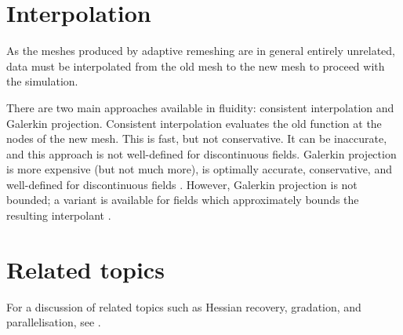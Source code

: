 \section{Interpolation} \label{sec:interpolation}
As the meshes produced by adaptive remeshing are in general entirely
unrelated, data must be interpolated from the old mesh to the new mesh
to proceed with the simulation.

There are two main approaches available in fluidity: consistent interpolation
and Galerkin projection. Consistent interpolation evaluates the old function
at the nodes of the new mesh. This is fast, but not conservative. It can be inaccurate,
and this approach is not well-defined for discontinuous fields.
Galerkin projection is more expensive (but not much more), is optimally accurate,
conservative, and well-defined for discontinuous fields \citep{farrell2009i}.
However, Galerkin projection is not bounded; a variant is available for \Pone fields
which approximately bounds the resulting interpolant \citep{farrell2009a,farrell2010a}.

\section{Related topics} \label{sec:adaptivity_related_topics}
For a discussion of related topics such as Hessian recovery, gradation, and parallelisation,
see \citep{farrell2009i}.

